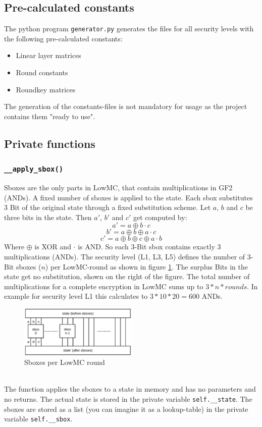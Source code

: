 \documentclass[]{article}
\begin{document}
\subsection{Pre-calculated constants}
The python program \texttt{generator.py} generates the files for all security levels with the following pre-calculated constants:
\begin{itemize}
\item{Linear layer matrices}
\item{Round constants}
\item{Roundkey matrices}
\end{itemize}
The generation of the constants-files is not mandatory for usage as the project contains them "ready to use". 
\subsection{Private functions}
\subsubsection{\texttt{\_\_apply\_sbox()}}
Sboxes are the only parts in LowMC, that contain multiplications in GF2 (ANDs). A fixed number of sboxes is applied to the state. Each sbox substitutes 3 Bit of the original state through a fixed substitution scheme. Let $a$, $b$ and $c$ be three bits in the state. Then $a'$, $b'$ and $c'$ get computed by:
\newpage
\[a' = a \oplus b \cdot c\]
\[b' = a \oplus b \oplus a \cdot c\]
\[c' = a \oplus b \oplus c \oplus a \cdot b\]
Where $\oplus$ is XOR and $\cdot$ is AND. So each 3-Bit sbox contains exactly 3 multiplications (ANDs). The security level (L1, L3, L5) defines the number of 3-Bit sboxes ($n$) per LowMC-round as shown in figure \ref{fig:sboxes}. The surplus Bits in the state get no substitution, shown on the right of the figure. The total number of multiplications for a complete encryption in LowMC sums up to $3 * n * rounds$. In example for security level L1 this calculates to $3 * 10 * 20 = 600$ ANDs.\\
\begin{figure}[htbp]
\center
\includegraphics[width=0.5\textwidth]{pics/sboxes.pdf}
\caption{Sboxes per LowMC round}
\label{fig:sboxes}
\end{figure}\\
The function applies the sboxes to a state in memory and has no parameters and no returns. The actual state is stored in the private variable \texttt{self.\_\_state}. The sboxes are stored as a list (you can imagine it as a lookup-table) in the private variable \texttt{self.\_\_sbox}.
\end{document}
